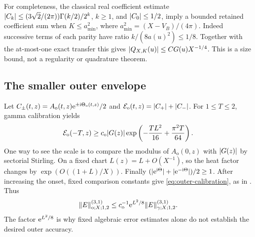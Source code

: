 For completeness, the classical real coefficient estimate
\(\lvert C_k\rvert\le (3\sqrt2/(2\pi))\Gamma(k/2)/2^k\), \(k\ge1\),
and \(\lvert C_0\rvert\le1/2\), imply a bounded retained coefficient sum
when \(K\le a_{\min}^2\), where
\(a_{\min}^2=(X-V_B)/(4\pi)\). Indeed successive terms of each
parity have ratio \(k/(8a(u)^2)\le1/8\).
Together with the at-most-one exact transfer this gives
\(\lvert Q_{X,K}(u)\rvert\le C G(u)X^{-1/4}\).
This is a size bound, not a regularity or quadrature theorem.

\subsection{The smaller outer envelope}
Let \(C_\pm(t,z)=A_{\mathrm o}(t,z)\mathrm e^{\pm\mathrm i\Theta_{\mathrm o}(t,z)}/2\)
and \(\mathcal E_{\mathrm o}(t,z)=\lvert C_+\rvert+\lvert C_-\rvert\).
For \(1\le T\le2\), gamma calibration yields
\begin{equation}
 \mathcal E_{\mathrm o}(-T,z)\ge
 c_{\mathrm o}\lvert G(z)\rvert
    \exp\left(-\frac{TL^2}{16}+\frac{\pi^2T}{64}\right).
 \label{eq:outer-calibration}
\end{equation}
One way to see the scale is to compare the modulus of
\(A_{\mathrm o}(0,z)\) with \(\lvert G(z)\rvert\) by sectorial Stirling.
On a fixed chart \(L(z)=L+O(X^{-1})\), so the heat factor changes
by \(\exp(O((1+L)/X))\). Finally
\((\lvert \mathrm e^{\mathrm i\Theta}\rvert+\lvert \mathrm e^{-\mathrm i\Theta}\rvert)/2\ge1\).
After increasing the onset, fixed comparison constants give
\eqref{eq:outer-calibration}, as in \cite{ans03,ans05}.
Thus
\begin{equation}
 \lVert E\rVert_{\mathrm o;X;1,2}^{(3,1)}\le c_{\mathrm o}^{-1}\mathrm e^{L^2/8}
       \lVert E\rVert_{\gamma;X;1,2}^{(3,1)}.
 \label{eq:outer-conversion}
\end{equation}
The factor \(\mathrm e^{L^2/8}\) is why fixed algebraic error estimates
alone do not establish the desired outer accuracy.
